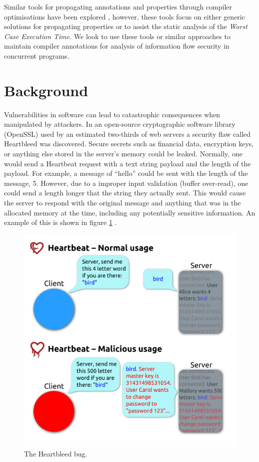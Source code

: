 \documentclass[twocolumn]{article}
\begin{document}
Similar tools for propagating annotations and properties through compiler optimisations have been explored \cite{vu2020secure} \cite{schommer2018embedded} \cite{leroy2016compcert}, however, these tools focus on either generic solutions for propagating properties or to assist the static analysis of the \textit{Worst Case Execution Time}. We look to use these tools or similar approaches to maintain compiler annotations for analysis of information flow security in concurrent programs.

\section{Background}
Vulnerabilities in software can lead to catastrophic consequences when manipulated by attackers. In an open-source cryptographic software library (OpenSSL) used by an estimated two-thirds of web servers \cite{heartbleed} a security flaw called Heartbleed was discovered. Secure secrets such as financial data, encryption keys, or anything else stored in the server's memory could be leaked. Normally, one would send a Heartbeat request with a text string payload and the length of the payload. For example, a message of ``hello'' could be sent with the length of the message, 5. However, due to a improper input validation (buffer over-read), one could send a length longer that the string they actually sent. This would cause the server to respond with the original message and anything that was in the allocated memory at the time, including any potentially sensitive information. An example of this is shown in figure \ref{fig:heartbleed} \cite{heartbleedimg}.

\begin{figure}
    \centering
    \includegraphics[width=\linewidth]{heartbleed.png}
    \caption{The Heartbleed bug. \cite{heartbleedimg}}
    \label{fig:heartbleed}
\end{figure}
\end{document}
